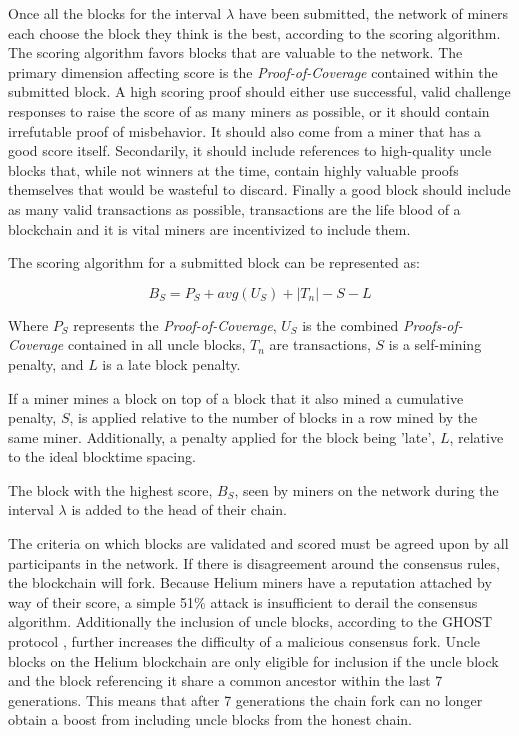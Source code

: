 \documentclass[UTF8, 10pt, nonatbib, nocopyrightspace, reprint]{sigplanconf}
\begin{document}
Once all the blocks for the interval $\lambda$ have been submitted, the network of miners each choose the block they think is the best, according to the scoring algorithm. The scoring algorithm favors blocks that are valuable to the network. The primary dimension affecting score is the \emph{Proof-of-Coverage} contained within the submitted block. A high scoring proof should either use successful, valid challenge responses to raise the score of as many miners as possible, or it should contain irrefutable proof of misbehavior. It should also come from a miner that has a good score itself. Secondarily, it should include references to high-quality uncle blocks that, while not winners at the time, contain highly valuable proofs themselves that would be wasteful to discard. Finally a good block should include as many valid transactions as possible, transactions are the life blood of a blockchain and it is vital miners are incentivized to include them.

The scoring algorithm for a submitted block can be represented as:

\[B_S = P_S + avg(U_S) + |T_n|  - S - L \]

Where $P_S$ represents the \emph{Proof-of-Coverage}, $U_S$ is the combined \emph{Proofs-of-Coverage} contained in all uncle blocks, $T_n$ are transactions, $S$ is a self-mining penalty, and $L$ is a late block penalty.

If a miner mines a block on top of a block that it also mined  a cumulative penalty, $S$, is applied relative to the number of blocks in a row mined by the same miner. Additionally, a penalty applied for the block being 'late', $L$, relative to the ideal blocktime spacing.

The block with the highest score, $B_S$, seen by miners on the network during the interval $\lambda$ is added to the head of their chain.

The criteria on which blocks are validated and scored must be agreed upon by all participants in the network. If there is disagreement around the consensus rules, the blockchain will fork. Because Helium miners have a reputation attached by way of their score, a simple 51\% attack is insufficient to derail the consensus algorithm. Additionally the inclusion of uncle blocks, according to the GHOST protocol \cite{ghost}, further increases the difficulty of a malicious consensus fork. Uncle blocks on the Helium blockchain are only eligible for inclusion if the uncle block and the block referencing it share a common ancestor within the last 7 generations. This means that after 7 generations the chain fork can no longer obtain a boost from including uncle blocks from the honest chain.
\end{document}
